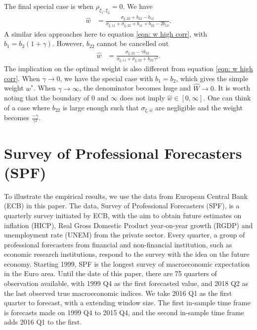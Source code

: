 \documentclass[11pt]{article}
\begin{document}
The final special case is when $\rho_{\xi_1,\xi_2}=0$. We have
\begin{equation}
\begin{aligned}
\hat{w} &= \frac{\sigma_{\xi,22}+b_{22}-b_{12}}{\sigma_{\xi,11}+\sigma_{\xi,22}+b_{11}+b_{22}-2b_{12}}.
\end{aligned}
\end{equation}
A similar idea approaches here to equation \ref{eqn: w high corr}, with $b_1 = b_2 (1+\gamma)$. However, $b_{22}$ cannot be cancelled out
\begin{equation}
\begin{aligned}
\hat{w} &= \frac{\sigma_{\xi,22}-\gamma b_{22}}{\sigma_{\xi,11}+\sigma_{\xi,22}+b_{22}\gamma^2}.
\end{aligned}
\end{equation}
The implication on the optimal weight is also different from equation \ref{eqn: w high corr}. When $\gamma \to 0$, we have the special case with $b_1=b_2$, which gives the simple weight $w^*$. When $\gamma \to \infty$, the denominator becomes huge and $\hat{W} \to 0$. It is worth noting that the boundary of 0 and $\infty$ does not imply $\hat{w} \in [0,\infty]$. One can think of a case where $b_{22}$ is large enough such that $\sigma_{\xi,ii}$ are negligible and the weight becomes $\frac{-\gamma}{\gamma^2}$. 



\section{Survey of Professional Forecasters
	(SPF)}\label{survey-of-professional-forecasters-spf}

To illustrate the empirical results, we use the data from European Central Bank (ECB) in this paper. The data, Survey of Professional Forecasters (SPF), is a
quarterly survey initiated by ECB, with the aim to obtain future
estimates on inflation (HICP), Real Gross Domestic Product year-on-year growth (RGDP) and unemployment rate (UNEM) from
the private sector. Every quarter, a group of professional forecasters
from financial and non-financial institution, such as economic research
institutions, respond to the survey with the idea on the future
economy. Starting 1999, SPF is the longest survey of macroeconomic
expectation in the Euro area. Until the date of this paper, there are 75
quarters of observation available, with 1999 Q4 as the first forecasted
value, and 2018 Q2 as the last observed true macroeconomic indices. We take 2016 Q1 as the first quarter to forecast, with a extending window size. The first in-sample time frame is forecasts made on 1999 Q4 to 2015 Q4, and the second in-sample time frame adds 2016 Q1 to the first.
\end{document}
